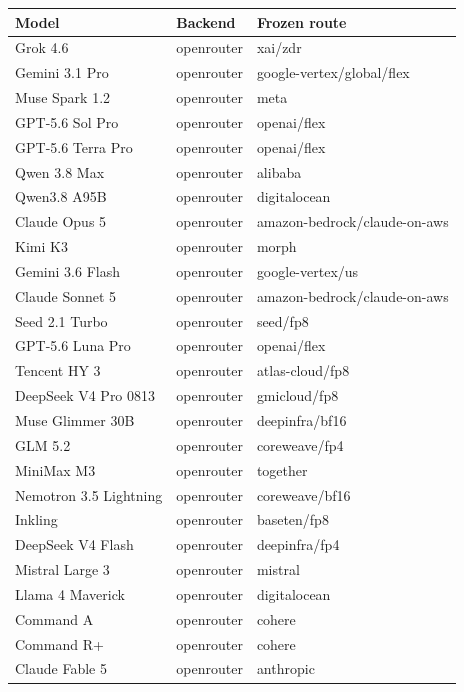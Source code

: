 \begin{tabular}{@{}l l l@{}}
\toprule
Model & Backend & Frozen route \\
\midrule
Grok 4.6 & openrouter & xai/zdr \\
Gemini 3.1 Pro & openrouter & google-vertex/global/flex \\
Muse Spark 1.2 & openrouter & meta \\
GPT-5.6 Sol Pro & openrouter & openai/flex \\
GPT-5.6 Terra Pro & openrouter & openai/flex \\
Qwen 3.8 Max & openrouter & alibaba \\
Qwen3.8 A95B & openrouter & digitalocean \\
Claude Opus 5 & openrouter & amazon-bedrock/claude-on-aws \\
Kimi K3 & openrouter & morph \\
Gemini 3.6 Flash & openrouter & google-vertex/us \\
Claude Sonnet 5 & openrouter & amazon-bedrock/claude-on-aws \\
Seed 2.1 Turbo & openrouter & seed/fp8 \\
GPT-5.6 Luna Pro & openrouter & openai/flex \\
Tencent HY 3 & openrouter & atlas-cloud/fp8 \\
DeepSeek V4 Pro 0813 & openrouter & gmicloud/fp8 \\
Muse Glimmer 30B & openrouter & deepinfra/bf16 \\
GLM 5.2 & openrouter & coreweave/fp4 \\
MiniMax M3 & openrouter & together \\
Nemotron 3.5 Lightning & openrouter & coreweave/bf16 \\
Inkling & openrouter & baseten/fp8 \\
DeepSeek V4 Flash & openrouter & deepinfra/fp4 \\
Mistral Large 3 & openrouter & mistral \\
Llama 4 Maverick & openrouter & digitalocean \\
Command A & openrouter & cohere \\
Command R+ & openrouter & cohere \\
Claude Fable 5 & openrouter & anthropic \\
\bottomrule
\end{tabular}
